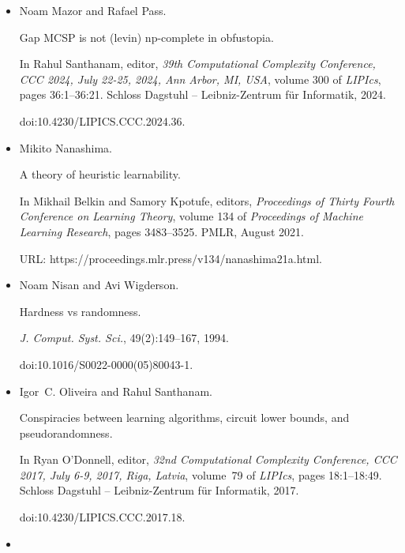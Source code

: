 \documentclass[10pt,a4paper]{article}
\begin{document}
\begin{itemize}
\item[] 
[38]

Noam Mazor and Rafael Pass.


Gap MCSP is not (levin) np-complete in obfustopia.


In Rahul Santhanam, editor, \emph{39th Computational Complexity
Conference, CCC 2024, July 22-25, 2024, Ann Arbor, MI, USA}, volume 300
of \emph{LIPIcs}, pages 36:1–36:21. Schloss Dagstuhl – Leibniz-Zentrum
für Informatik, 2024.


doi:10.4230/LIPICS.CCC.2024.36.





\item[] 
[39]

Mikito Nanashima.


A theory of heuristic learnability.


In Mikhail Belkin and Samory Kpotufe, editors, \emph{Proceedings of
Thirty Fourth Conference on Learning Theory}, volume 134 of \emph{Proceedings
of Machine Learning Research}, pages 3483–3525. PMLR, August 2021.


URL: https://proceedings.mlr.press/v134/nanashima21a.html.





\item[] 
[40]

Noam Nisan and Avi Wigderson.


Hardness vs randomness.


\emph{J. Comput. Syst. Sci.}, 49(2):149–167, 1994.


doi:10.1016/S0022-0000(05)80043-1.





\item[] 
[41]

Igor C. Oliveira and Rahul Santhanam.


Conspiracies between learning algorithms, circuit lower bounds, and
pseudorandomness.


In Ryan O’Donnell, editor, \emph{32nd Computational Complexity
Conference, CCC 2017, July 6-9, 2017, Riga, Latvia}, volume 79 of \emph{LIPIcs}, pages 18:1–18:49. Schloss Dagstuhl – Leibniz-Zentrum für
Informatik, 2017.


doi:10.4230/LIPICS.CCC.2017.18.





\item[] 
[42]


\end{itemize}
\end{document}
